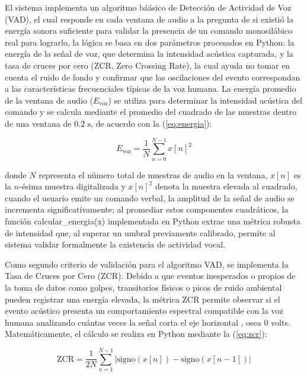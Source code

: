 \documentclass[conference]{IEEEtran}
\begin{document}
El sistema implementa un algoritmo bá\'asico de Detección de Actividad de Voz (VAD), el cual responde en cada ventana de audio a la pregunta de si existió la energía sonora suficiente para validar la presencia de un comando monosilábico real para lograrlo, la lógica se basa en dos parámetros procesados en Python: la energía de la señal de voz, que determina la intensidad acústica capturada, y la tasa de cruces por cero (ZCR, Zero Crossing Rate), la cual ayuda no tomar en cuenta el ruido de fondo y confirmar que las oscilaciones del evento correspondan a las características frecuenciales típicas de la voz humana.\cite{b6} La energ\'ia promedio de la ventana de audio ($E_{\text{voz}}$) se utiliza para determinar la intensidad ac\'ustica del comando y se calcula mediante el promedio del cuadrado de las muestras dentro de una ventana de $0.2\text{ s}$, de acuerdo con la (\ref{eq:energia}):

\begin{equation}
E_{\text{voz}} = \frac{1}{N} \sum_{n=0}^{N-1} x[n]^2
\label{eq:energia}
\end{equation}

donde $N$ representa el n\'umero total de muestras de audio en la ventana, $x[n]$ es la $n$-\'esima muestra digitalizada y $x[n]^2$ denota la muestra elevada al cuadrado, cuando el usuario emite un comando verbal, la amplitud de la se\~nal de audio se incrementa significativamente; al promediar estos componentes cuadr\'aticos, la funci\'on calcular\_energia(x) implementada en Python extrae una m\'etrica robusta de intensidad que, al superar un umbral previamente calibrado, permite al sistema validar formalmente la existencia de actividad vocal.

Como segundo criterio de validaci\'on para el algoritmo VAD, se implementa la Tasa de Cruces por Cero (ZCR). Debido a que eventos inesperados o propios de la toma de datos como golpes, transitorios f\'isicos o picos de ruido ambiental pueden registrar una energ\'ia elevada, la m\'etrica ZCR permite observar si el evento ac\'ustico presenta un comportamiento espectral compatible con la voz humana analizando cu\'antas veces la se\~nal corta el eje horizontal , osea 0 volts. Matem\'aticamente, el c\'alculo se realiza en Python mediante la (\ref{eq:zcr}):

\begin{equation}
\text{ZCR} = \frac{1}{2N} \sum_{n=1}^{N-1} |\text{signo}(x[n]) - \text{signo}(x[n-1])|
\label{eq:zcr}
\end{equation}
\end{document}
